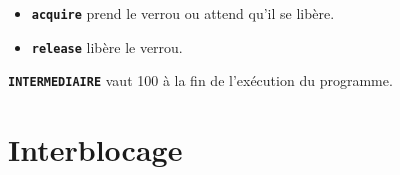 \documentclass[svgnames,11pt]{beamer}
\begin{document}
\begin{frame}
    \frametitle{}

    \begin{itemize}
        \item \textbf{\texttt{acquire}} prend le verrou ou attend qu'il se libère.
        \item \textbf{\texttt{release}} libère le verrou.
    \end{itemize}
    \begin{center}
        \textbf{\texttt{INTERMEDIAIRE}} vaut 100 à la fin de l'exécution du programme.
    \end{center}
\end{frame}
\section{Interblocage}
\end{document}

